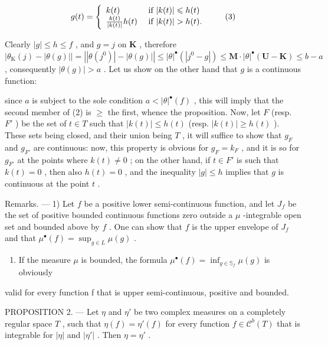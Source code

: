 \[
g (t) = \left\{ \begin{array}{l l} k (t) & \text { if } | k (t) | \leqslant h (t) \\ \frac {k (t)}{| k (t) |} h (t) & \text { if } | k (t) | > h (t). \end{array} \right.\tag{3}
\]

Clearly \(|g| \leqslant h \leqslant f\) , and \(g = j\) on \(\mathbf{K}\) , therefore \(\left|\theta_{\mathrm{K}}(j) - |\theta(g)|\right| = \left|\left|\theta(j^0)\right| - |\theta(g)|\right| \leqslant |\theta|^{\bullet}(|j^0 - g|) \leqslant \mathbf{M} \cdot |\theta|^{\bullet}(\mathbf{U} - \mathbf{K}) \leqslant b - a\) , consequently \(|\theta(g)| > a\) . Let us show on the other hand that \(g\) is a continuous function:

since \(a\) is subject to the sole condition \(a < |\theta|^{\bullet}(f)\) , this will imply that the second member of (2) is \(\geqslant\) the first, whence the proposition. Now, let \(F\) (resp. \(F'\) ) be the set of \(t \in T\) such that \(|k(t)| \leqslant h(t)\) (resp. \(|k(t)| \geqslant h(t)\) ). These sets being closed, and their union being \(T\) , it will suffice to show that \(g_{F}\) and \(g_{F'}\) are continuous: now, this property is obvious for \(g_{F} = k_{F}\) , and it is so for \(g_{F'}\) at the points where \(k(t) \neq 0\) ; on the other hand, if \(t \in F'\) is such that \(k(t) = 0\) , then also \(h(t) = 0\) , and the inequality \(|g| \leqslant h\) implies that \(g\) is continuous at the point \(t\) .

Remarks. --- 1) Let \(f\) be a positive lower semi-continuous function, and let \(J_f\) be the set of positive bounded continuous functions zero outside a \(\mu\) -integrable open set and bounded above by \(f\) . One can show that \(f\) is the upper envelope of \(J_f\) and that \(\mu^\bullet(f) = \sup_{g \in L} \mu(g)\) .

\begin{enumerate}
\def\labelenumi{\arabic{enumi})}
\setcounter{enumi}{1}
\tightlist
\item
  If the measure \(\mu\) is bounded, the formula \(\mu^{\bullet}(f) = \inf_{g\in \mathbb{S}_f}\mu (g)\) is obviously
\end{enumerate}

valid for every function f that is upper semi-continuous, positive and bounded.

PROPOSITION 2. --- Let \(\eta\) and \(\eta'\) be two complex measures on a completely regular space \(T\) , such that \(\eta(f) = \eta'(f)\) for every function \(f \in \mathcal{C}^b(T)\) that is integrable for \(|\eta|\) and \(|\eta'|\) . Then \(\eta = \eta'\) .


